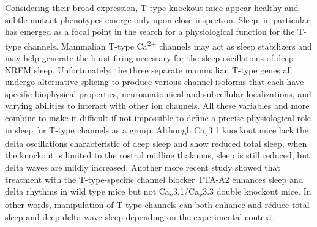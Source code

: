 Considering their broad expression, T-type knockout mice appear healthy and subtle mutant phenotypes emerge only upon close inspection.
Sleep, in particular, has emerged as a focal point in the search for a physiological function for the T-type channels.
Mammalian T-type Ca\textsuperscript{2+} channels may act as sleep stabilizers and may help generate the burst firing necessary for the sleep oscillations of deep NREM sleep.
Unfortunately, the three separate mammalian T-type genes all undergo alternative splicing to produce various channel isoforms that each have specific biophysical properties, neuroanatomical and subcellular localizations, and varying abilities to interact with other ion channels.
All these variables and more combine to make it difficult if not impossible to define a precise physiological role in sleep for T-type channels as a group.
Although Ca\textsubscript{v}3.1 knockout mice lack the delta oscillations characteristic of deep sleep and show reduced total sleep\cite{Lee:2004ey}, when the knockout is limited to the rostral midline thalamus, sleep is still reduced, but delta waves are mildly increased\cite{anderson:2005aa}. Another more recent study showed that treatment with the T-type-specific channel blocker TTA-A2 enhances sleep and delta rhythms in wild type mice but not Ca\textsubscript{v}3.1/Ca\textsubscript{v}3.3 double knockout mice\cite{kraus:2010aa}. In other words, manipulation of T-type channels can both enhance and reduce total sleep and deep delta-wave sleep depending on the experimental context.


